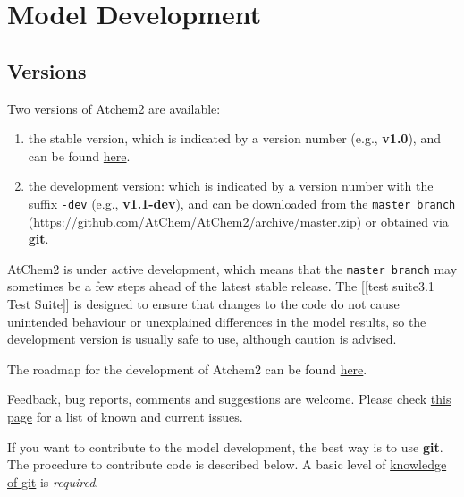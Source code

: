 \chapter{Model Development} \label{ch:development}

\section{Versions} \label{sec:versions}

Two versions of Atchem2 are available:

\begin{enumerate}
\def\labelenumi{\arabic{enumi})}
\item
  the stable version, which is indicated by a version number (e.g.,
  \textbf{v1.0}), and can be found
  \href{https://github.com/AtChem/AtChem2/releases}{here}.
\item
  the development version: which is indicated by a version number with
  the suffix \texttt{-dev} (e.g., \textbf{v1.1-dev}), and can be
  downloaded from the \texttt{master\ branch}
  (https://github.com/AtChem/AtChem2/archive/master.zip) or obtained via
  \textbf{git}.
\end{enumerate}

AtChem2 is under active development, which means that the
\texttt{master\ branch} may sometimes be a few steps ahead of the latest
stable release. The {[}{[}test suite\textbar{}3.1 Test Suite{]}{]} is
designed to ensure that changes to the code do not cause unintended
behaviour or unexplained differences in the model results, so the
development version is usually safe to use, although caution is advised.

The roadmap for the development of Atchem2 can be found
\href{https://github.com/AtChem/AtChem2/projects/1}{here}.

Feedback, bug reports, comments and suggestions are welcome. Please
check \href{https://github.com/AtChem/AtChem2/issues}{this page} for a
list of known and current issues.

If you want to contribute to the model development, the best way is to
use \textbf{git}. The procedure to contribute code is described below. A
basic level of
\href{https://swcarpentry.github.io/git-novice/}{knowledge of git} is
\emph{required}.

